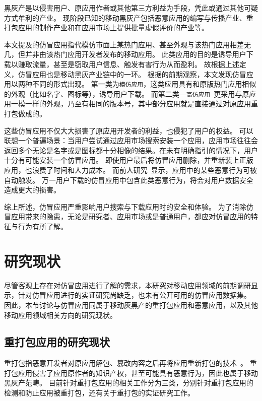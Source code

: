 黑灰产是以侵害用户、原应用作者或其他第三方利益为手段，凭此或通过其他可疑方式牟利的产业。
现阶段已知的移动黑灰产包括恶意应用的编写与传播产业、重打包应用的制作产业和在应用市场上提供批量虚假评价的产业等。

本文提及的仿冒应用指代模仿市面上某热门应用、甚至外观与该热门应用相差无几，但并非由该热门应用开发者发布的移动应用。
此类应用的目的是诱导用户下载以赚取流量，甚至是窃取用户信息、触发有害行为从而盈利。
故根据上述定义，仿冒应用也是移动黑灰产业链中的一环。
根据的前期观察，本文发现仿冒应用以两种不同的形式出现。
第一类为\texttt{模仿应用}，这类应用具有和原版热门应用相似的外观（比如名字、图标等），诱导用户下载。
而第二类---\texttt{高仿应用}~\cite{Andow2016ASO, luo2016repackage}更采用与原应用一模一样的外观，乃至有相同的版本号，其中部分应用就是直接通过对原应用重打包做成的。

这些仿冒应用不仅大大损害了原应用开发者的利益，也侵犯了用户的权益。
可以联想一个普遍场景：当用户尝试通过应用市场搜索安装一个应用，应用市场往往会返回多个无论是名字或是图标都十分相像的结果。在未有明确指引的情况下，用户十分有可能安装一个仿冒应用。
即使用户最后将仿冒应用删除，并重新装上正版应用，也浪费了时间和人力成本。
而前人研究~\cite{Zhou2012DissectingAM}显示，应用中的某些恶意行为可被自动触发。
万一用户下载的仿冒应用中包含此类恶意行为，将会对用户数据安全造成更大的损害。

综上所述，仿冒应用严重影响用户搜索与下载应用时的安全和体验。
为了消除仿冒应用带来的隐患，无论是研究者、应用市场或是普通用户，都应对仿冒应用的特征与行为有所了解。

\section{研究现状}
尽管客观上存在对仿冒应用进行了解的需求，本研究对移动应用领域的前期调研显示，针对仿冒应用进行的实证研究尚缺乏，也未有公开可用的仿冒应用数据集。
因此，本节讨论与仿冒应用同属于移动灰黑产的重打包应用和恶意应用，以及其他移动应用领域相关方向的研究现状。

\subsection{重打包应用的研究现状}
\label{sec:repackaging}
重打包指恶意开发者对原应用解包、篡改内容之后再将应用重新打包的技术~\cite{khanmohammadi2019empirical}。
重打包应用侵害了应用原作者的知识产权，甚至可能具有恶意行为，因此也属于移动黑灰产范畴。
目前针对重打包应用的相关工作分为三类，分别针对重打包应用的检测和防止应用被重打包，还有关于重打包的实证研究工作。

